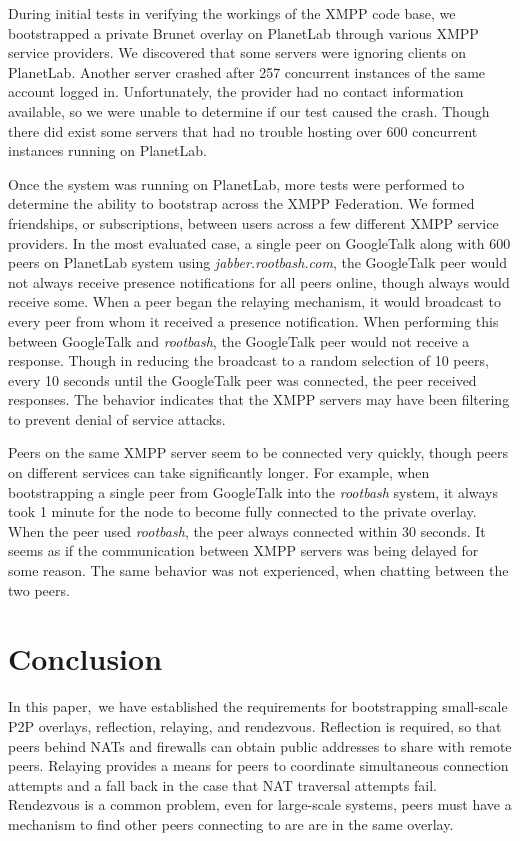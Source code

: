 \documentclass[conference]{IEEEtran}
\begin{document}
During initial tests in verifying the workings of the XMPP code base, we
bootstrapped a  private Brunet overlay on PlanetLab through various XMPP
service providers.  We discovered that some servers were ignoring clients on
PlanetLab.  Another server crashed after 257 concurrent instances of the same
account logged in.  Unfortunately, the provider had no contact information
available, so we were unable to determine if our test caused the crash.  Though
there did exist some servers that had no trouble hosting over 600 concurrent
instances running on PlanetLab.

Once the system was running on PlanetLab, more tests were performed to
determine the ability to bootstrap across the XMPP Federation.  We formed
friendships, or subscriptions, between users across a few different XMPP
service providers.  In the most evaluated case, a single peer on GoogleTalk
along with 600 peers on PlanetLab system using \textit{jabber.rootbash.com},
the GoogleTalk peer would not always receive presence notifications for all
peers online, though always would receive some.  When a peer began the relaying
mechanism, it would broadcast to every peer from whom it received a presence
notification.  When performing this between GoogleTalk and \textit{rootbash},
the GoogleTalk peer would not receive a response.  Though in reducing the
broadcast to a random selection of 10 peers, every 10 seconds until the
GoogleTalk peer was connected, the peer received responses.  The behavior
indicates that the XMPP servers may have been filtering to prevent denial of
service attacks.

Peers on the same XMPP server seem to be connected very quickly, though peers
on different services can take significantly longer.  For example, when
bootstrapping a single peer from GoogleTalk into the \textit{rootbash} system,
it always took 1 minute for the node to become fully connected to the private
overlay.  When the peer used \textit{rootbash}, the peer always connected
within 30 seconds.  It seems as if the communication between XMPP servers was
being delayed for some reason.  The same behavior was not experienced, when
chatting between the two peers.

\section{Conclusion}
\label{conclusions}

In this paper, we have established the requirements for bootstrapping
small-scale P2P overlays, reflection, relaying, and rendezvous.  Reflection is
required, so that peers behind NATs and firewalls can obtain public addresses
to share with remote peers.  Relaying provides a means for peers to coordinate
simultaneous connection attempts and a fall back in the case that NAT traversal
attempts fail.  Rendezvous is a common problem, even for large-scale systems,
peers must have a mechanism to find other peers connecting to are are in the
same overlay.  
\end{document}
